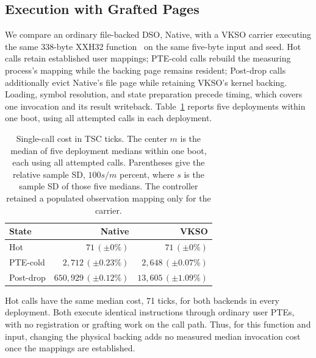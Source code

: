 \subsection{Execution with Grafted Pages}
\label{sec:page-grafting}

We compare an ordinary file-backed DSO, Native, with a VKSO carrier
executing the same 338-byte XXH32 function~\cite{ev_xxhash} on the same
five-byte input and seed. Hot calls retain established user mappings;
PTE-cold calls rebuild the measuring process's mapping while the backing
page remains resident; Post-drop calls additionally evict Native's file
page while retaining VKSO's kernel backing. Loading, symbol resolution,
and state preparation precede timing, which covers one invocation and
its result writeback. Table~\ref{tab:first-touch} reports five deployments
within one boot, using all attempted calls in each deployment.

\begin{table}[htbp]
\centering\small
\setlength{\tabcolsep}{3pt}
\caption{Single-call cost in TSC ticks. The center $m$ is the median of
five deployment medians within one boot, each using all attempted calls.
Parentheses give the relative sample SD, $100s/m$ percent, where $s$
is the sample SD of those five medians. The controller retained a
populated observation mapping only for the carrier.}
\label{tab:first-touch}
\begin{tabular*}{\columnwidth}{@{\extracolsep{\fill}}lrr@{}}
\toprule
State & Native & VKSO \\
\midrule
Hot & $71\,(\pm0\%)$ & $71\,(\pm0\%)$ \\
PTE-cold & $2{,}712\,(\pm0.23\%)$ & $2{,}648\,(\pm0.07\%)$ \\
Post-drop & $650{,}929\,(\pm0.12\%)$ & $13{,}605\,(\pm1.09\%)$ \\
\bottomrule
\end{tabular*}
\end{table}

Hot calls have the same median cost, 71 ticks, for both backends in every
deployment. Both execute identical instructions through ordinary user
PTEs, with no registration or grafting work on the call path. Thus, for
this function and input, changing the physical backing adds no measured
median invocation cost once the mappings are established.

